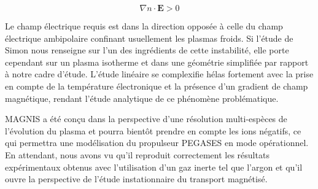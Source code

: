 \begin{refsection}
	\begin{equation}
		\nabla n\cdot \mathbf E>0
	\end{equation}
	
	Le champ électrique requis est dans la direction opposée à celle du champ
	électrique ambipolaire confinant usuellement les plasmas froids. Si l'étude de
	Simon nous renseigne sur l'un des ingrédients de cette instabilité, elle porte
	cependant sur un plasma isotherme et dans une géométrie simplifiée par rapport
	à notre cadre d'étude. L'étude linéaire se complexifie hélas fortement avec la
	prise en compte de la température électronique et la présence d'un gradient
	de champ magnétique, rendant l'étude analytique de ce phénomène problématique.

	MAGNIS a été conçu dans la perspective d'une résolution multi-espèces de
	l'évolution du plasma et pourra bientôt prendre en compte les ions
	négatifs, ce qui permettra une modélisation du propulseur PEGASES en mode
	opérationnel. En attendant, nous avons vu qu'il reproduit correctement les
	résultats expérimentaux obtenus avec l'utilisation d'un gaz inerte tel que
	l'argon et qu'il ouvre la perspective de l'étude instationnaire du transport
	magnétisé.
	

\end{refsection}
